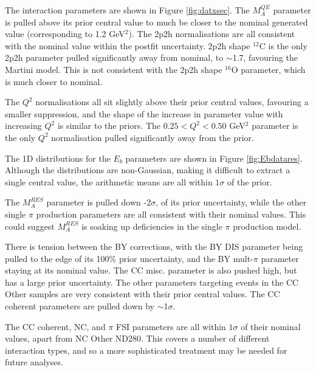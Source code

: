 The interaction parameters are shown in Figure \ref{fig:datxsec}. The $M^{QE}_A$ parameter is pulled above its prior central value to much be closer to the nominal generated value (corresponding to 1.2 GeV$^2$). The 2p2h normalisations are all consistent with the nominal value within the postfit uncertainty. 2p2h shape $^{12}$C is the only 2p2h parameter pulled significantly away from nominal, to $\sim$1.7, favouring the Martini model. This is not consistent with the 2p2h shape $^{16}$O parameter, which is much closer to nominal.

The $Q^2$ normalisations all sit slightly above their prior central values, favouring a smaller suppression, and the shape of the increase in parameter value with increasing $Q^2$ is similar to the priors. The $0.25 < Q^2< 0.50$ GeV$^2$ parameter is the only $Q^2$ normalisation pulled significantly away from the prior.

The 1D distributions for the $E_b$ parameters are shown in Figure \ref{fig:Ebdatares}. Although the distributions are non-Gaussian, making it difficult to extract a single central value, the arithmetic means are all within $1\sigma$ of the prior.

The $M_A^{RES}$ parameter is pulled down -2$\sigma$, of its prior uncertainty, while the other single $\pi$ production parameters are all consistent with their nominal values. This could suggest $M_A^{RES}$ is soaking up deficiencies in the single $\pi$ production model.

There is tension between the BY corrections, with the BY DIS parameter being pulled to the edge of its 100$\%$ prior uncertainty, and the BY mult-$\pi$ parameter staying at its nominal value. The CC misc. parameter is also pushed high, but has a large prior uncertainty. The other parameters targeting events in the CC Other samples are very consistent with their prior central values. The CC coherent parameters are pulled down by $\sim$1$\sigma$.

The CC coherent, NC, and $\pi$ FSI parameters are all within $1\sigma$ of their nominal values, apart from NC Other ND280. This covers a number of different interaction types, and so a more sophisticated treatment may be needed for future analyses. 

